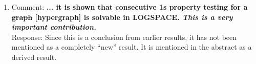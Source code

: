 \documentclass[12pt,a4paper]{article}
\begin{document}
\begin{enumerate}
{\begin{problemdef}{\FMFT}{An in-tree partition $\bP_i$ of a hypergraph
    $\cF$ and a subtree $T_i$ of a tree $T$.}
  Compute a feasible TPL for $mub(\bP_i)$ from subtree $T_i$.
\end{problemdef}
}


\item Comment: {\bf ... it is shown that consecutive 1s property
    testing for a \sout {graph} [hypergraph] is solvable in LOGSPACE. {\em This is a very
      important contribution.}}\\
Response: Since this is a conclusion from earlier results, it has not
been mentioned as a completely ``new'' result. It is mentioned in the abstract as a
derived result.
\end{enumerate}




%
\end{document}
